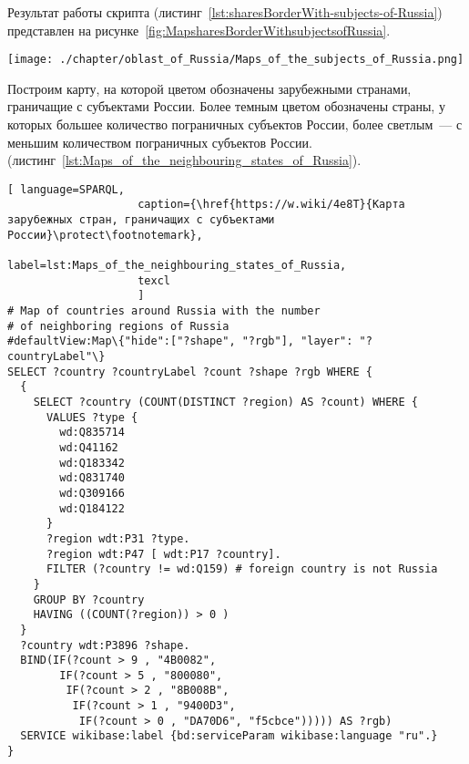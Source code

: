 Результат работы скрипта (листинг~\ref{lst:sharesBorderWith-subjects-of-Russia}) представлен на рисунке~\ref{fig:MapsharesBorderWithsubjectsofRussia}.

\begin{fullwidth}
\begin{figure*}[h]
	\texttt{[image: ./chapter/oblast\_of\_Russia/Maps\_of\_the\_subjects\_of\_Russia.png]}
	\caption[Карта субъектов России, граничащих с зарубежными странами, 2021.]{Карта субъектов России, граничащих с зарубежными странами, 2021. Карта построена на основе данных, полученных с помощью запроса~\protect\ref{lst:sharesBorderWith-subjects-of-Russia}.}%
      \label{fig:MapsharesBorderWithsubjectsofRussia}%
\end{figure*} 
\end{fullwidth}

\newpage
Построим карту, на которой цветом обозначены зарубежными странами, граничащие с субъектами России. Более темным цветом обозначены страны, у которых большее количество пограничных субъектов России, более светлым~--- с меньшим количеством пограничных субъектов России. (листинг~\ref{lst:Maps_of_the_neighbouring_states_of_Russia}).

\lstset{numbers=left, firstnumber=1, frame=single}
\begin{lstlisting}[ language=SPARQL, 
                    caption={\href{https://w.wiki/4e8T}{Карта зарубежных стран, граничащих с субъектами России}\protect\footnotemark},
                    label=lst:Maps_of_the_neighbouring_states_of_Russia,
                    texcl 
                    ]
# Map of countries around Russia with the number 
# of neighboring regions of Russia
#defaultView:Map\{"hide":["?shape", "?rgb"], "layer": "?countryLabel"\}
SELECT ?country ?countryLabel ?count ?shape ?rgb WHERE {
  {
    SELECT ?country (COUNT(DISTINCT ?region) AS ?count) WHERE {
      VALUES ?type {
        wd:Q835714
        wd:Q41162
        wd:Q183342
        wd:Q831740
        wd:Q309166
        wd:Q184122
      }
      ?region wdt:P31 ?type.
      ?region wdt:P47 [ wdt:P17 ?country].
      FILTER (?country != wd:Q159) # foreign country is not Russia
    }
    GROUP BY ?country
    HAVING ((COUNT(?region)) > 0 )
  }
  ?country wdt:P3896 ?shape.
  BIND(IF(?count > 9 , "4B0082", 
        IF(?count > 5 , "800080", 
         IF(?count > 2 , "8B008B", 
          IF(?count > 1 , "9400D3", 
           IF(?count > 0 , "DA70D6", "f5cbce"))))) AS ?rgb)
  SERVICE wikibase:label {bd:serviceParam wikibase:language "ru".}
}
\end{lstlisting}%

